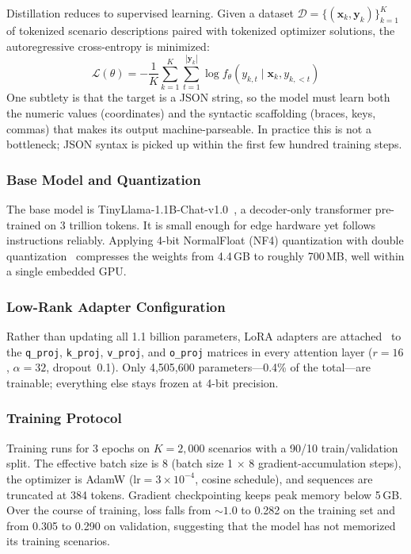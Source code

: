 \documentclass[journal]{IEEEtran}
\begin{document}
Distillation reduces to supervised learning. Given a dataset $\mathcal{D} = \{(\mathbf{x}_k, \mathbf{y}_k)\}_{k=1}^{K}$ of tokenized scenario descriptions paired with tokenized optimizer solutions, the autoregressive cross-entropy is minimized:
\begin{equation}
    \mathcal{L}(\theta) = -\frac{1}{K}\sum_{k=1}^{K} \sum_{t=1}^{|\mathbf{y}_k|} \log f_\theta(y_{k,t} \mid \mathbf{x}_k, y_{k,<t})
    \label{eq:loss}
\end{equation}
One subtlety is that the target is a JSON string, so the model must learn both the numeric values (coordinates) and the syntactic scaffolding (braces, keys, commas) that makes its output machine-parseable. In practice this is not a bottleneck; JSON syntax is picked up within the first few hundred training steps.

\subsubsection{Base Model and Quantization}

The base model is TinyLlama-1.1B-Chat-v1.0~\cite{zhang2024tinyllama}, a decoder-only transformer pre-trained on 3 trillion tokens. It is small enough for edge hardware yet follows instructions reliably. Applying 4-bit NormalFloat (NF4) quantization with double quantization~\cite{dettmers2023qlora} compresses the weights from 4.4\,GB to roughly 700\,MB, well within a single embedded GPU.

\subsubsection{Low-Rank Adapter Configuration}

Rather than updating all 1.1 billion parameters, LoRA adapters are attached~\cite{hu2022lora} to the \texttt{q\_proj}, \texttt{k\_proj}, \texttt{v\_proj}, and \texttt{o\_proj} matrices in every attention layer ($r{=}16$, $\alpha{=}32$, dropout~0.1). Only 4{,}505{,}600 parameters---0.4\% of the total---are trainable; everything else stays frozen at 4-bit precision.

\subsubsection{Training Protocol}

Training runs for 3 epochs on $K = 2{,}000$ scenarios with a 90/10 train/validation split. The effective batch size is 8 (batch size 1 $\times$ 8 gradient-accumulation steps), the optimizer is AdamW ($\text{lr} = 3{\times}10^{-4}$, cosine schedule), and sequences are truncated at 384 tokens. Gradient checkpointing keeps peak memory below 5\,GB. Over the course of training, loss falls from ${\sim}1.0$ to 0.282 on the training set and from 0.305 to 0.290 on validation, suggesting that the model has not memorized its training scenarios.
\end{document}
